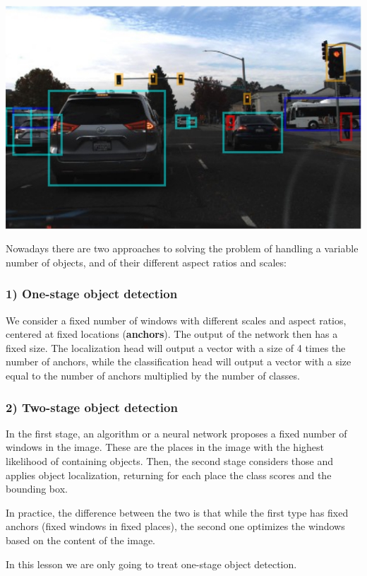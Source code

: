 \includegraphics[width=0.5\linewidth]{img//cnn//depth/ooexample.jpeg}

Nowadays there are two approaches to solving the problem of handling a variable number of objects, and of their different aspect ratios and scales:

\subsubsection{1) One-stage object detection}

We consider a fixed number of windows with different scales and aspect ratios, centered at fixed locations (\textbf{anchors}). The output of the network then has a fixed size. The localization head will output a vector with a size of 4 times the number of anchors, while the classification head will output a vector with a size equal to the number of anchors multiplied by the number of classes.

\subsubsection{2) Two-stage object detection}

In the first stage, an algorithm or a neural network proposes a fixed number of windows in the image. These are the places in the image with the highest likelihood of containing objects. Then, the second stage considers those and applies object localization, returning for each place the class scores and the bounding box. \newline

In practice, the difference between the two is that while the first type has fixed anchors (fixed windows in fixed places), the second one optimizes the windows based on the content of the image. \newline

In this lesson we are only going to treat one-stage object detection.

